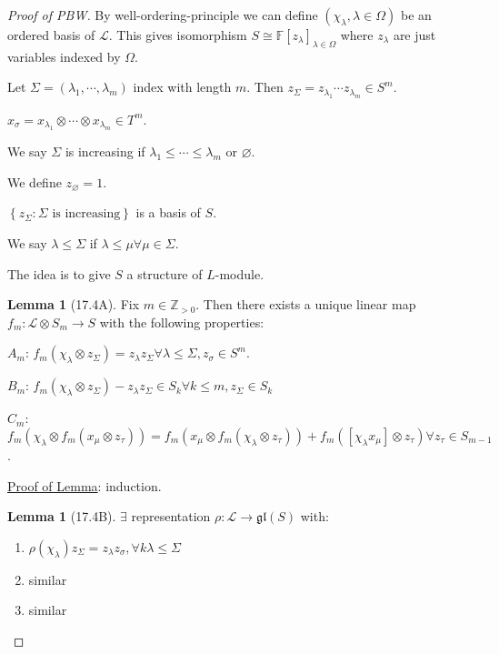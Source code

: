 \documentclass{article}
\theoremstyle{definition}
\newtheorem{lemma}[theorem]{Lemma}
\begin{document}
    \begin{proof}
        [Proof of PBW]

        By well-ordering-principle we can define \((\chi_\lambda, \lambda \in \Omega)\) be an ordered basis of \(\mathcal{L}\). This gives isomorphism \(S \cong\mathbb{F}[z_{\lambda}]_{\lambda \in \Omega}\) where \(z_\lambda\) are just variables indexed by \(\Omega\).

        Let \(\Sigma = (\lambda_1, \cdots , \lambda_m)\) index with length \(m\). Then \(z_\Sigma = z_{\lambda_1} \cdots z_{\lambda_m} \in S^m\).

        \(x_\sigma = x_{\lambda_1} \otimes \cdots \otimes x_{\lambda_m} \in T^m\).

        We say \(\Sigma\) is increasing if \(\lambda_1 \leq \cdots \leq \lambda_m\) or \(\varnothing\).
        
        We define \(z_{\varnothing} = 1\).

        \(\left\{ z_\Sigma : \Sigma \text{ is increasing}  \right\}\) is a basis of \(S\).

        We say \(\lambda \leq \Sigma\) if \(\lambda \leq \mu \forall \mu \in \Sigma\).

        The idea is to give \(S\) a structure of \(L\)-module.

        \begin{lemma}
            [17.4A] Fix \(m\in \mathbb{Z}_{>0}\). Then there exists a unique linear map \(f_m: \mathcal{L} \otimes S_m \to S\) with the following properties:

            \(A_m\): \(f_m(\chi_\lambda \otimes z_\Sigma) = z_\lambda z_\Sigma \forall \lambda \leq \Sigma , z_\sigma \in S^m\).

            \(B_m\): \(f_m(\chi_\lambda \otimes z_\Sigma)- z_\lambda z_\Sigma \in S_k \forall k \leq m, z_\Sigma \in S_k\)

            \(C_m\): \(f_m(\chi_\lambda \otimes f_m(x_\mu \otimes z_{\tau} )) = f_m(x_\mu \otimes f_m(\chi_\lambda \otimes z_{\tau})) + f_m([\chi_\lambda x_\mu] \otimes z_{\tau}) \forall z_{\tau} \in S_{m-1}\).
        \end{lemma}

        \underline{Proof of Lemma}: induction.

        \begin{lemma}
            [17.4B] \(\exists\) representation \(\rho : \mathcal{L} \to \mathfrak{gl}(S)\) with:

            \begin{enumerate}[label=\alph*)]
                \item \(\rho(\chi_\lambda) z_\Sigma = z_\lambda z_\sigma, \forall k\lambda \leq \Sigma\)
                \item similar
                \item similar 
            \end{enumerate} 
        \end{lemma}


\end{proof}
\end{document}
